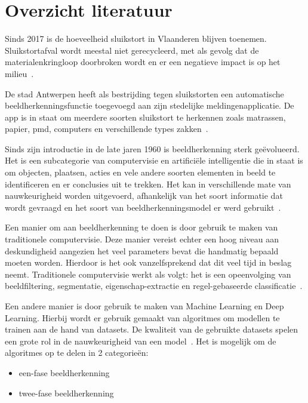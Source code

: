 \documentclass{hogent-article}
\begin{document}
\section{Overzicht literatuur}


Sinds 2017 is de hoeveelheid sluikstort in Vlaanderen blijven toenemen. Sluikstortafval wordt meestal niet gerecycleerd, met als gevolg dat de materialenkringloop doorbroken wordt en er een negatieve impact is op het milieu~\autocite{Baryon2021}.

De stad Antwerpen heeft als bestrijding tegen sluikstorten een automatische beeldherkenningsfunctie toegevoegd aan zijn stedelijke meldingenapplicatie. De app is in staat om meerdere soorten sluikstort te herkennen  zoals matrassen, papier, pmd, computers en verschillende types zakken~\autocite{Antwerpen}.

Sinds zijn introductie in de late jaren 1960 is beeldherkenning sterk geëvolueerd. Het is een subcategorie van computervisie en artificiële intelligentie die in staat is om objecten, plaatsen, acties en vele andere soorten elementen in beeld te identificeren en er conclusies uit te trekken. Het kan in verschillende mate van nauwkeurigheid worden uitgevoerd, afhankelijk van het soort informatie dat wordt gevraagd en het soort van beeldherkenningsmodel er werd gebruikt~\autocite{Ewan}.

Een manier om aan beeldherkenning te doen is door gebruik te maken van traditionele computervisie. Deze manier vereist echter een hoog niveau aan deskundigheid aangezien het veel parameters bevat die handmatig bepaald moeten worden. Hierdoor is het ook vanzelfsprekend dat dit veel tijd in beslag neemt. Traditionele computervisie werkt als volgt: het is een opeenvolging van beeldfiltering, segmentatie, eigenschap-extractie en regel-gebaseerde classificatie~\autocite{Meel}.

Een andere manier is door gebruik te maken van Machine Learning en Deep Learning. Hierbij wordt er gebruik gemaakt van algoritmes om modellen te trainen aan de hand van datasets. De kwaliteit van de gebruikte datasets spelen een grote rol in de nauwkeurigheid van een model~\autocite{Haponik2022}. Het is mogelijk om de algoritmes op te delen in 2 categorieën:

\begin{itemize}
    \item een-fase beeldherkenning
    \item twee-fase beeldherkenning
\end{itemize}
\end{document}
